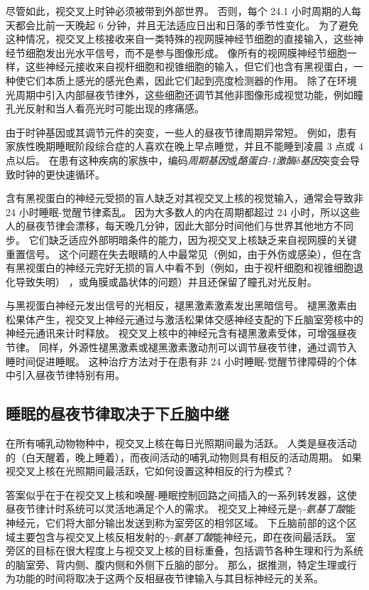 尽管如此，视交叉上时钟必须被带到外部世界。
否则，每个 24.1 小时周期的人每天都会比前一天晚起 6 分钟，并且无法适应日出和日落的季节性变化。
为了避免这种情况，视交叉上核接收来自一类特殊的视网膜神经节细胞的直接输入，这些神经节细胞发出光水平信号，而不是参与图像形成。
像所有的视网膜神经节细胞一样，这些神经元接收来自视杆细胞和视锥细胞的输入，但它们也含有黑视蛋白，一种使它们本质上感光的感光色素，因此它们起到亮度检测器的作用。
除了在环境光周期中引入内部昼夜节律外，这些细胞还调节其他非图像形成视觉功能，例如瞳孔光反射和当人看亮光时可能出现的疼痛感。


由于时钟基因或其调节元件的突变，一些人的昼夜节律周期异常短。
例如，患有家族性晚期睡眠阶段综合症的人喜欢在晚上早点睡觉，并且不能睡到凌晨 3 点或 4 点以后。
在患有这种疾病的家族中，编码\textit{周期基因}或\textit{酪蛋白-1激酶$\delta$基因}突变会导致时钟的更快速循环。


含有黑视蛋白的神经元受损的盲人缺乏对其视交叉上核的视觉输入，通常会导致非 24 小时睡眠-觉醒节律紊乱。
因为大多数人的内在周期都超过 24 小时，所以这些人的昼夜节律会漂移，每天晚几分钟，因此大部分时间他们与世界其他地方不同步。
它们缺乏适应外部明暗条件的能力，因为视交叉上核缺乏来自视网膜的关键重置信号。
这个问题在失去眼睛的人中最常见（例如，由于外伤或感染），但在含有黑视蛋白的神经元完好无损的盲人中看不到（例如，由于视杆细胞和视锥细胞退化导致失明） ，或角膜或晶状体的问题）并且还保留了瞳孔对光反射。


与黑视蛋白神经元发出信号的光相反，褪黑激素激素发出黑暗信号。
褪黑激素由松果体产生，视交叉上神经元通过与激活松果体交感神经支配的下丘脑室旁核中的神经元通讯来计时释放。
视交叉上核中的神经元含有褪黑激素受体，可增强昼夜节律。
同样，外源性褪黑激素或褪黑激素激动剂可以调节昼夜节律，通过调节入睡时间促进睡眠。
这种治疗方法对于在患有非 24 小时睡眠-觉醒节律障碍的个体中引入昼夜节律特别有用。



\subsection{睡眠的昼夜节律取决于下丘脑中继}

在所有哺乳动物物种中，视交叉上核在每日光照期间最为活跃。
人类是昼夜活动的（白天醒着，晚上睡着），而夜间活动的哺乳动物则具有相反的活动周期。
如果视交叉上核在光照期间最活跃，它如何设置这种相反的行为模式？


答案似乎在于在视交叉上核和唤醒-睡眠控制回路之间插入的一系列转发器，这使昼夜节律计时系统可以灵活地满足个人的需求。
视交叉上神经元是\textit{$\gamma$-氨基丁酸}能神经元，它们将大部分输出发送到称为室旁区的相邻区域。
下丘脑前部的这个区域主要包含与视交叉上核反相发射的\textit{$\gamma$-氨基丁酸}能神经元，即在夜间最活跃。
室旁区的目标在很大程度上与视交叉上核的目标重叠，包括调节各种生理和行为系统的脑室旁、背内侧、腹内侧和外侧下丘脑的部分。
那么，据推测，特定生理或行为功能的时间将取决于这两个反相昼夜节律输入与其目标神经元的关系。


